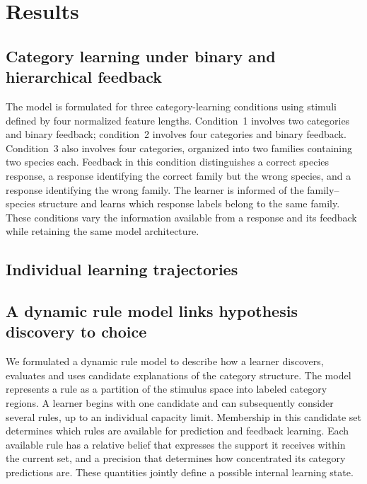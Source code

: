 \section*{Results}\label{sec:results}

\subsection*{Category learning under binary and hierarchical feedback}
\label{r:task}

The model is formulated for three category-learning conditions using stimuli
defined by four normalized feature lengths. Condition~1 involves two
categories and binary feedback; condition~2 involves four categories and
binary feedback. Condition~3 also involves four categories, organized into
two families containing two species each. Feedback in this condition
distinguishes a correct species response, a response identifying the correct
family but the wrong species, and a response identifying the wrong family.
The learner is informed of the family--species structure and learns which
response labels belong to the same family. These conditions vary the
information available from a response and its feedback while retaining the
same model architecture.

\subsection*{Individual learning trajectories}
\label{r:behavior}

\subsection*{A dynamic rule model links hypothesis discovery to choice}
\label{r:model}

We formulated a dynamic rule model to describe how a learner discovers,
evaluates and uses candidate explanations of the category structure. The
model represents a rule as a partition of the stimulus space into labeled
category regions. A learner begins with one candidate and can subsequently
consider several rules, up to an individual capacity limit. Membership in
this candidate set determines which rules are available for prediction and
feedback learning. Each available rule has a relative belief that expresses
the support it receives within the current set, and a precision that
determines how concentrated its category predictions are.
These quantities jointly define a possible internal learning state.


